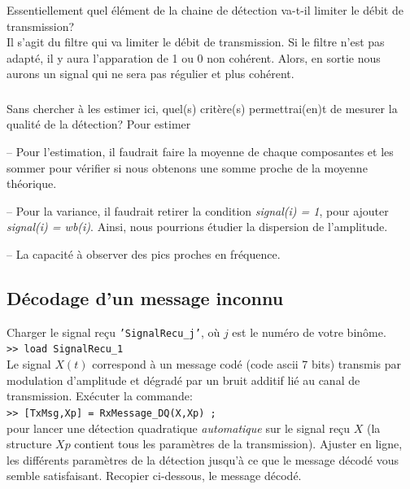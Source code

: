 \documentclass{article}
\begin{document}
\subsubsection{}

Essentiellement quel élément de la chaine de détection va-t-il limiter le débit de transmission?\\
\newline
Il s'agit du filtre  qui va limiter le débit de transmission. Si le filtre n’est pas adapté, il y aura l'apparation de 1 ou 0 non cohérent. Alors, en sortie nous aurons un signal qui ne sera pas régulier et plus cohérent.


\subsubsection{}
Sans chercher à les estimer ici, quel(s) critère(s) permettrai(en)t de mesurer la qualité de la détection?
\newline
Pour estimer 
\begin{list}{-}{\setlength{\leftmargin}{9mm} \setlength{\labelwidth}{20mm} \setlength{\labelsep}{2mm} \setlength{\itemsep}{1mm} }
\item[--] Pour l'estimation, il faudrait faire la moyenne de chaque composantes et les sommer pour vérifier si nous obtenons une somme proche de la moyenne théorique.
\item[--] Pour la variance, il faudrait retirer la condition \textit{ signal(i) = 1}, pour ajouter  \textit{ signal(i) = wb(i)}. Ainsi, nous pourrions étudier la dispersion de l'amplitude. 
\item[--] La capacité à observer des pics proches en fréquence. 
\end{list} 


\subsection{Décodage d'un message inconnu}


Charger le signal reçu {\tt 'SignalRecu\_j'}, où $j$ est le numéro de votre binôme.\\[2mm]
{\tt >\!> load SignalRecu\_1}\\[2mm]
Le signal $X(t)$ correspond à un message codé (code ascii 7 bits) transmis par modulation d'amplitude et  dégradé par un bruit additif lié au canal de transmission. 
Exécuter  la  commande: \\[2mm]
{\tt >\!> [TxMsg,Xp] = RxMessage\_DQ(X,Xp) ; }  \\[2mm]
pour lancer une détection quadratique {\em automatique} sur le signal reçu $X$ (la structure $Xp$ contient tous les paramètres de la transmission).
Ajuster en ligne, les différents paramètres de la détection jusqu'à ce que le message décodé vous semble satisfaisant. Recopier ci-dessous, le message décodé. \\
\end{document}
